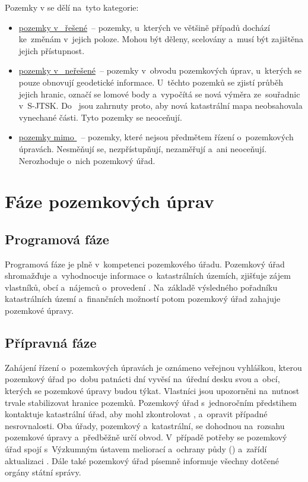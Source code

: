Pozemky v  se dělí na~tyto kategorie:
\vspace{-\topsep}
	\begin{itemize}[leftmargin=1.5cm, noitemsep]
		\item \underline{pozemky v~ řešené}~– pozemky, u~kte\-rých ve většině případů dochází ke~změnám v~jejich poloze. Mohou být děleny, scelovány a~musí být zajištěna jejich přístupnost.
		\item \underline{pozemky v~ neřešené}~– pozemky v~obvodu pozemkových úprav, u~kte\-rých se pouze obnovují geodetické informace. U~těchto pozemků se zjistí průběh jejich hranic, označí se lomové body a~vypočítá se nová výměra ze~souřadnic v~S-JTSK. Do~ jsou zahrnuty proto, aby nová katastrální mapa neobsahovala vynechané části. Tyto pozemky se neoceňují.
		\item \underline{pozemky mimo }~– pozemky, které nejsou předmětem řízení o~pozem\-kových úpravách. Nesměňují se, nezpřístupňují, nezaměřují a~ani neoceňují. Nerozhoduje o~nich pozemkový úřad.
	\end{itemize}

\section{Fáze pozemkových úprav}
\label{etapy_pu}

\subsection{Programová fáze}
\label{programova_faze}

Programová fáze je plně v~kompetenci pozemkového úřadu. Pozemkový úřad shromažďuje a~vyhodnocuje informace o~katastrálních územích, zjišťuje zájem vlastníků, obcí a~nájemců o~provedení . Na~základě výsledného pořadníku katastrálních území a~finančních možností potom pozemkový úřad zahajuje pozemkové úpravy.

\subsection{Přípravná fáze}
\label{pripravna_faze}

Zahájení řízení o~pozemkových úpravách je oznámeno veřejnou vyhláškou, kterou pozemkový úřad po~dobu patnácti dní vyvěsí na~úřední desku svou a~obcí, kterých se pozemkové úpravy budou týkat. Vlastníci jsou upozorněni na~nutnost trvale stabilizovat hranice pozemků. Pozemkový úřad s~jednoročním předstihem kontaktuje katastrální úřad, aby mohl zkontrolovat ,  a~opravit případné nesrovnalosti. Oba úřady, pozemkový a~katastrální, se dohodnou na~rozsahu pozemkové úpravy a~předběžně určí obvod. V~případě potřeby se pozemkový úřad spojí s~Výzkumným ústavem meliorací a~ochrany půdy () a~zařídí aktualizaci . Dále také pozemkový úřad písemně informuje všechny dotčené orgány státní správy.

